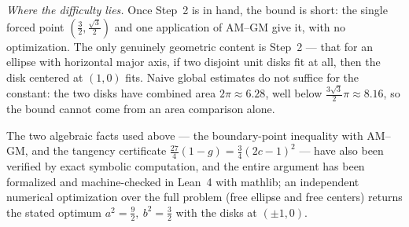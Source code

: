 \documentclass[11pt]{article}
\begin{document}
\emph{Where the difficulty lies.} Once Step~2 is in hand, the bound is short: the single forced point
$(\tfrac32,\tfrac{\sqrt3}{2})$ and one application of AM--GM give it, with no optimization. The only
genuinely geometric content is Step~2 --- that for an ellipse with horizontal major axis, if two
disjoint unit disks fit at all, then the disk centered at $(1,0)$ fits. Naive global estimates do not
suffice for the constant: the two disks have combined area $2\pi\approx6.28$, well below
$\tfrac{3\sqrt3}{2}\pi\approx8.16$, so the bound cannot come from an area comparison alone.

\medskip
\footnotesize\noindent The two algebraic facts used above --- the boundary-point inequality with
AM--GM, and the tangency certificate $\tfrac{27}{4}(1-g)=\tfrac34(2c-1)^2$ --- have also been verified
by exact symbolic computation, and the entire argument has been formalized and machine-checked in
Lean~4 with mathlib; an independent numerical optimization over the full problem (free ellipse and
free centers) returns the stated optimum
$a^2=\tfrac92,\ b^2=\tfrac32$ with the disks at $(\pm1,0)$.
\end{document}
